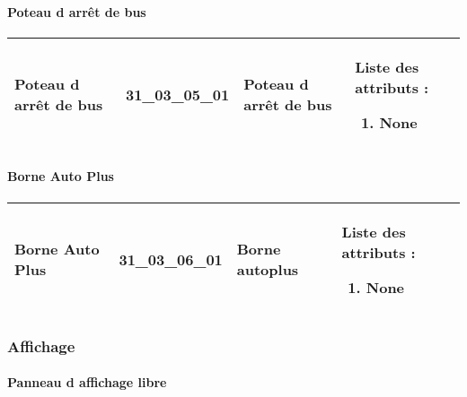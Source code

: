 \documentclass[12pt,titlepage,oneside]{book}
\begin{document}
\paragraph{Poteau d arrêt de bus}
\noindent
\vspace{\baselineskip}

\renewcommand{\arraystretch}{1.2}
\begin{supertabular}{|p{10cm}|c|p{13cm}|p{12cm}|}
 Poteau d arrêt de bus & 31\_03\_05\_01 & Poteau d arrêt de bus & Liste des attributs :
\begin{enumerate}
  \item None\end{enumerate}
\\
\hline
\end{supertabular}
\begin{figure}[h!]
  \hfill         %
\end{figure}


\paragraph{Borne Auto Plus}
\noindent
\vspace{\baselineskip}

\renewcommand{\arraystretch}{1.2}
\begin{supertabular}{|p{10cm}|c|p{13cm}|p{12cm}|}
 Borne Auto Plus & 31\_03\_06\_01 & Borne autoplus & Liste des attributs :
\begin{enumerate}
  \item None\end{enumerate}
\\
\hline
\end{supertabular}
\begin{figure}[h!]
  \hfill         %
\end{figure}

\subsubsection{\large Affichage}
\paragraph{Panneau d affichage libre}
\noindent
\vspace{\baselineskip}
\end{document}
